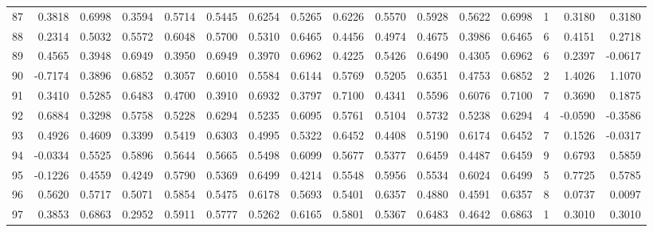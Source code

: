 \begin{tabular}{lrrrrrrrrrrrrrrr}
87  &      0.3818 &  0.6998 &  0.3594 &  0.5714 &  0.5445 &  0.6254 &  0.5265 &  0.6226 &  0.5570 &  0.5928 &   0.5622 &     0.6998 &      1 &                    0.3180 &                     0.3180 \\
88  &      0.2314 &  0.5032 &  0.5572 &  0.6048 &  0.5700 &  0.5310 &  0.6465 &  0.4456 &  0.4974 &  0.4675 &   0.3986 &     0.6465 &      6 &                    0.4151 &                     0.2718 \\
89  &      0.4565 &  0.3948 &  0.6949 &  0.3950 &  0.6949 &  0.3970 &  0.6962 &  0.4225 &  0.5426 &  0.6490 &   0.4305 &     0.6962 &      6 &                    0.2397 &                    -0.0617 \\
90  &     -0.7174 &  0.3896 &  0.6852 &  0.3057 &  0.6010 &  0.5584 &  0.6144 &  0.5769 &  0.5205 &  0.6351 &   0.4753 &     0.6852 &      2 &                    1.4026 &                     1.1070 \\
91  &      0.3410 &  0.5285 &  0.6483 &  0.4700 &  0.3910 &  0.6932 &  0.3797 &  0.7100 &  0.4341 &  0.5596 &   0.6076 &     0.7100 &      7 &                    0.3690 &                     0.1875 \\
92  &      0.6884 &  0.3298 &  0.5758 &  0.5228 &  0.6294 &  0.5235 &  0.6095 &  0.5761 &  0.5104 &  0.5732 &   0.5238 &     0.6294 &      4 &                   -0.0590 &                    -0.3586 \\
93  &      0.4926 &  0.4609 &  0.3399 &  0.5419 &  0.6303 &  0.4995 &  0.5322 &  0.6452 &  0.4408 &  0.5190 &   0.6174 &     0.6452 &      7 &                    0.1526 &                    -0.0317 \\
94  &     -0.0334 &  0.5525 &  0.5896 &  0.5644 &  0.5665 &  0.5498 &  0.6099 &  0.5677 &  0.5377 &  0.6459 &   0.4487 &     0.6459 &      9 &                    0.6793 &                     0.5859 \\
95  &     -0.1226 &  0.4559 &  0.4249 &  0.5790 &  0.5369 &  0.6499 &  0.4214 &  0.5548 &  0.5956 &  0.5534 &   0.6024 &     0.6499 &      5 &                    0.7725 &                     0.5785 \\
96  &      0.5620 &  0.5717 &  0.5071 &  0.5854 &  0.5475 &  0.6178 &  0.5693 &  0.5401 &  0.6357 &  0.4880 &   0.4591 &     0.6357 &      8 &                    0.0737 &                     0.0097 \\
97  &      0.3853 &  0.6863 &  0.2952 &  0.5911 &  0.5777 &  0.5262 &  0.6165 &  0.5801 &  0.5367 &  0.6483 &   0.4642 &     0.6863 &      1 &                    0.3010 &                     0.3010 \\

\end{tabular}
